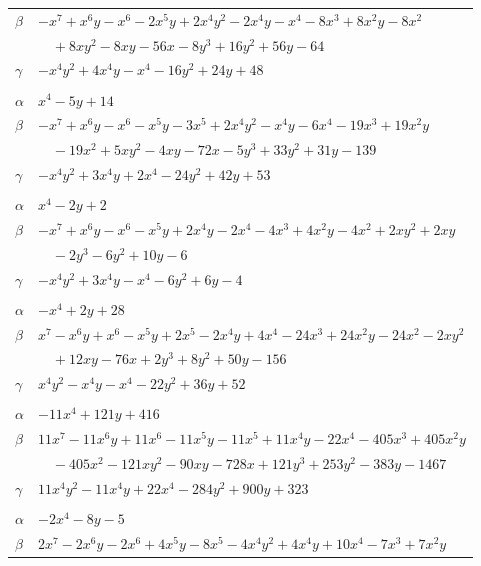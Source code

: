 \documentclass[11pt]{article}
\begin{document}
\begin{longtable}{@{}ll@{}}
$\beta$ & $-x^{7}+x^{6}y-x^{6}-2x^{5}y+2x^{4}y^{2}-2x^{4}y-x^{4}-8x^{3}+8x^{2}y-8x^{2}$\\
 & $\quad +8xy^{2}-8xy-56x-8y^{3}+16y^{2}+56y-64$\\
$\gamma$ & $-x^{4}y^{2}+4x^{4}y-x^{4}-16y^{2}+24y+48$\\
\addlinespace[3pt]
\multicolumn{2}{@{}l}{$\{i,j\}=\{10,25\}$, $k_{ij}=5^{3}$}\\
$\alpha$ & $x^{4}-5y+14$\\
$\beta$ & $-x^{7}+x^{6}y-x^{6}-x^{5}y-3x^{5}+2x^{4}y^{2}-x^{4}y-6x^{4}-19x^{3}+19x^{2}y$\\
 & $\quad -19x^{2}+5xy^{2}-4xy-72x-5y^{3}+33y^{2}+31y-139$\\
$\gamma$ & $-x^{4}y^{2}+3x^{4}y+2x^{4}-24y^{2}+42y+53$\\
\addlinespace[3pt]
\multicolumn{2}{@{}l}{$\{i,j\}=\{10,26\}$, $k_{ij}=2^{3}$}\\
$\alpha$ & $x^{4}-2y+2$\\
$\beta$ & $-x^{7}+x^{6}y-x^{6}-x^{5}y+2x^{4}y-2x^{4}-4x^{3}+4x^{2}y-4x^{2}+2xy^{2}+2xy$\\
 & $\quad -2y^{3}-6y^{2}+10y-6$\\
$\gamma$ & $-x^{4}y^{2}+3x^{4}y-x^{4}-6y^{2}+6y-4$\\
\addlinespace[3pt]
\multicolumn{2}{@{}l}{$\{i,j\}=\{10,27\}$, $k_{ij}=2^{2}\cdot 3^{2}\cdot 5$}\\
$\alpha$ & $-x^{4}+2y+28$\\
$\beta$ & $x^{7}-x^{6}y+x^{6}-x^{5}y+2x^{5}-2x^{4}y+4x^{4}-24x^{3}+24x^{2}y-24x^{2}-2xy^{2}$\\
 & $\quad +12xy-76x+2y^{3}+8y^{2}+50y-156$\\
$\gamma$ & $x^{4}y^{2}-x^{4}y-x^{4}-22y^{2}+36y+52$\\
\addlinespace[3pt]
\multicolumn{2}{@{}l}{$\{i,j\}=\{10,34\}$, $k_{ij}=3^{4}\cdot 5$}\\
$\alpha$ & $-11x^{4}+121y+416$\\
$\beta$ & $11x^{7}-11x^{6}y+11x^{6}-11x^{5}y-11x^{5}+11x^{4}y-22x^{4}-405x^{3}+405x^{2}y$\\
 & $\quad -405x^{2}-121xy^{2}-90xy-728x+121y^{3}+253y^{2}-383y-1467$\\
$\gamma$ & $11x^{4}y^{2}-11x^{4}y+22x^{4}-284y^{2}+900y+323$\\
\addlinespace[3pt]
\multicolumn{2}{@{}l}{$\{i,j\}=\{11,22\}$, $k_{ij}=2\cdot 5$}\\
$\alpha$ & $-2x^{4}-8y-5$\\
$\beta$ & $2x^{7}-2x^{6}y-2x^{6}+4x^{5}y-8x^{5}-4x^{4}y^{2}+4x^{4}y+10x^{4}-7x^{3}+7x^{2}y$\\

\end{longtable}
\end{document}
